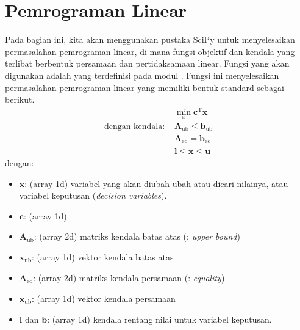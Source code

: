 \section{Pemrograman Linear}

Pada bagian ini, kita akan menggunakan pustaka SciPy untuk menyelesaikan permasalahan
pemrograman linear, di mana fungsi objektif dan kendala yang terlibat berbentuk
persamaan dan pertidaksamaan linear. Fungsi yang akan digunakan adalah 
yang terdefinisi pada modul . Fungsi ini menyelesaikan permasalahan
pemrograman linear yang memiliki bentuk standard sebagai berikut.
\begin{align*}
& \min_{x} \mathbf{c}^{\mathrm{T}} \mathbf{x} \\
\text{dengan kendala:}\,\, & \mathbf{A}_{\mathrm{ub}} \leq \mathbf{b}_{\mathrm{ub}} \\
& \mathbf{A}_{\mathrm{eq}} = \mathbf{b}_{\mathrm{eq}} \\
& \mathbf{l} \leq \mathbf{x} \leq \mathbf{u}
\end{align*}
dengan:
\begin{itemize}
\item $\mathbf{x}$: (array 1d) variabel yang akan diubah-ubah
atau dicari nilainya, atau variabel keputusan (\textit{decision variables}).
\item $\mathbf{c}$: (array 1d)
\item $\mathbf{A}_{\mathrm{ub}}$: (array 2d) matriks kendala batas atas
(: \textit{upper bound})
\item $\mathbf{x}_{\mathrm{ub}}$: (array 1d) vektor kendala batas atas
\item $\mathbf{A}_{\mathrm{eq}}$: (array 2d) matriks kendala persamaan
(: \textit{equality})
\item $\mathbf{x}_{\mathrm{ub}}$: (array 1d) vektor kendala persamaan
\item $\mathbf{l}$ dan $\mathbf{b}$: (array 1d) kendala rentang nilai untuk
variabel keputusan.
\end{itemize}
